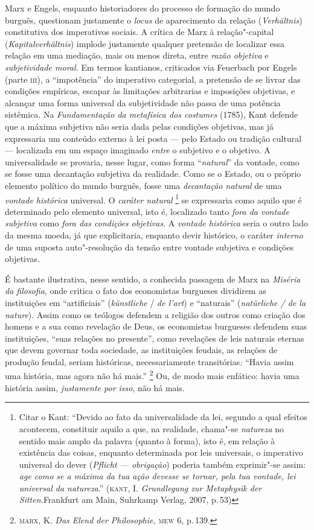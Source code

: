 Marx e Engels, enquanto historiadores do processo de formação do mundo
burguês, questionam justamente o \emph{locus} de aparecimento da relação
(\emph{Verhältnis}) constitutiva dos imperativos sociais. A crítica de
Marx à relação"-capital (\emph{Kapitalverhältnis}) implode justamente
qualquer pretensão de localizar essa relação em uma mediação, mais ou
menos direta, entre \emph{razão objetiva} e \emph{subjetividade moral.}
Em termos kantianos, criticados via Feuerbach por Engels (parte \textsc{iii}), a
``impotência'' do imperativo categorial, a pretensão de se livrar das
condições empíricas, escapar às limitações arbitrarias e imposições
objetivas, e alcançar uma forma universal da subjetividade não passa de
uma potência sistêmica. Na \emph{Fundamentação da metafísica dos
costumes} (1785), Kant defende que a máxima subjetiva não seria
dada pelas condições objetivas, mas já expressaria um conteúdo externo à
lei posta --- pelo Estado ou tradição cultural --- localizada em um espaço
imaginado \emph{entre} o subjetivo e o objetivo. A universalidade se
provaria, nesse lugar, como forma ``\emph{natural}'' da vontade, como se
fosse uma decantação subjetiva da realidade. Como se o Estado, ou o
próprio elemento político do mundo burguês, fosse uma \emph{decantação
natural} de uma \emph{vontade histórica} universal. O
\emph{caráter natural} \footnote{Citar o Kant: ``Devido ao fato da
  universalidade da lei, segundo a qual efeitos acontecem, constituir
  aquilo a que, na realidade, chama"-se \emph{natureza} no sentido mais
  amplo da palavra (quanto à forma), isto é, em relação à existência das
  coisas, enquanto determinada por leis universais, o imperativo
  universal do dever (\emph{Pflicht --- obrigação}) poderia também
  exprimir"-se assim: \emph{age como se a máxima da tua ação devesse se
  tornar, pela tua vontade, lei universal da natureza}.'' (\textsc{kant}, I.
  \emph{Grundlegung zur Metaphysik der Sitten.}Frankfurt am Main,
  Suhrkamp Verlag, 2007, p.\,53)} se expressaria como aquilo que é
determinado pelo elemento universal, isto é, localizado tanto \emph{fora
da vontade subjetiva} como \emph{fora das condições objetivas}. A
\emph{vontade histórica} seria o outro lado da mesma moeda, já que
explicitaria, enquanto devir histórico, o caráter \emph{interno} de uma
suposta auto"-resolução da tensão entre vontade subjetiva e condições
objetivas.

É bastante ilustrativa, nesse sentido, a conhecida passagem de Marx na
\emph{Miséria da filosofia}, onde critica o fato dos economistas
burgueses dividirem as instituições em ``artificiais''
(\emph{künstliche} / \emph{de l'art}) e ``naturais'' (\emph{natürliche /
de la nature}). Assim como os teólogos defendem a religião dos outros
como criação dos homens e a sua como revelação de Deus, os economistas
burgueses defendem suas instituições, ``suas relações no presente'',
como revelações de leis naturais eternas que devem governar toda
sociedade, as instituições feudais, as relações de produção feudal,
seriam históricas, necessariamente transitórias\emph{:} ``Havia assim
uma história, mas agora não há mais.'' \footnote{\textsc{marx}, K. \emph{Das
  Elend der Philosophie,} \textsc{mew} 6, p.\,139.} Ou, de modo mais enfático:
havia uma história assim, \emph{justamente por isso}, não há mais.

